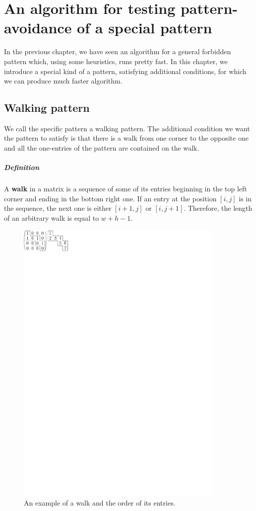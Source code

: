\chapter{An algorithm for testing pattern-avoidance of a special pattern}
\label{chap:walking}
In the previous chapter, we have seen an algorithm for a general forbidden pattern which, using some heuristics, runs pretty fast. In this chapter, we introduce a special kind of a pattern, satisfying additional conditions, for which we can produce much faster algorithm.

\section{Walking pattern}
We call the specific pattern a walking pattern. The additional condition we want the pattern to satisfy is that there is a walk from one corner to the opposite one and all the one-entries of the pattern are contained on the walk.
\paragraph{Definition}
A \textbf{walk} in a matrix is a sequence of some of its entries beginning in the top left corner and ending in the bottom right one. If an entry at the position $[i,j]$ is in the sequence, the next one is either $[i+1,j]$ or $[i,j+1]$. Therefore, the length of an arbitrary walk is equal to $w+h-1$.
\begin{figure}[h!]
\centering
\includegraphics[width=100mm]{../img/walk.pdf}
\caption{An example of a walk and the order of its entries.}
\label{walk}
\end{figure}

